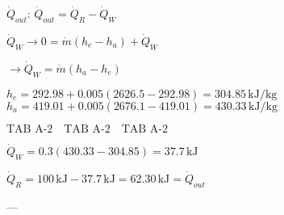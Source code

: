 \( \dot{Q}_{out} \):  
\( \dot{Q}_{out} = \dot{Q}_R - \dot{Q}_W \)  

\( \dot{Q}_W \rightarrow 0 = \dot{m} (h_e - h_a) + \dot{Q}_W \)  

\( \rightarrow \dot{Q}_W = \dot{m} (h_a - h_e) \)  

\( h_e = 292.98 + 0.005 (2626.5 - 292.98) = 304.85 \, \text{kJ/kg} \)  
\( h_a = 419.01 + 0.005 (2676.1 - 419.01) = 430.33 \, \text{kJ/kg} \)  

\( \text{TAB A-2} \quad \text{TAB A-2} \quad \text{TAB A-2} \)  

\( \dot{Q}_W = 0.3 (430.33 - 304.85) = 37.7 \, \text{kJ} \)  

\( \dot{Q}_R = 100 \, \text{kJ} - 37.7 \, \text{kJ} = 62.30 \, \text{kJ} = \dot{Q}_{out} \)  

---